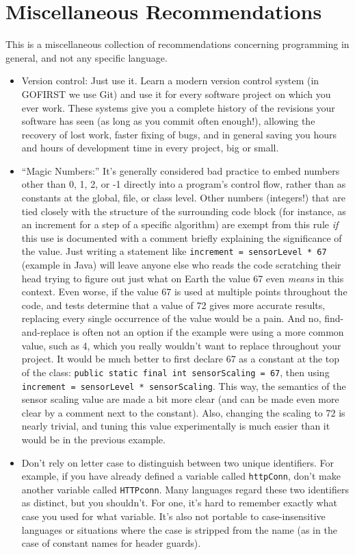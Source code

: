 \documentclass[12pt]{article}
\newcommand{\code}[1]{\texttt{#1}}
\begin{document}
\section{Miscellaneous Recommendations}
This is a miscellaneous collection of recommendations concerning programming in general, and not any specific language.
\begin{itemize}
    \item Version control: Just use it. Learn a modern version control system (in GOFIRST we use Git) and use it for every software project on which you ever work. These systems give you a complete history of the revisions your software has seen (as long as you commit often enough!), allowing the recovery of lost work, faster fixing of bugs, and in general saving you hours and hours of development time in every project, big or small.
    \item ``Magic Numbers:'' It's generally considered bad practice to embed numbers other than 0, 1, 2, or -1 directly into a program's control flow, rather than as constants at the global, file, or class level. Other numbers (integers!) that are tied closely with the structure of the surrounding code block (for instance, as an increment for a step of a specific algorithm) are exempt from this rule \emph{if} this use is documented with a comment briefly explaining the significance of the value. Just writing a statement like \code{increment = sensorLevel * 67} (example in Java) will leave anyone else who reads the code scratching their head trying to figure out just what on Earth the value 67 even \emph{means} in this context. Even worse, if the value 67 is used at multiple points throughout the code, and tests determine that a value of 72 gives more accurate results, replacing every single occurrence of the value would be a pain. And no, find-and-replace is often not an option if the example were using a more common value, such as 4, which you really wouldn't want to replace throughout your project. It would be much better to first declare 67 as a constant at the top of the class: \code{public static final int sensorScaling = 67}, then using \code{increment = sensorLevel * sensorScaling}. This way, the semantics of the sensor scaling value are made a bit more clear (and can be made even more clear by a comment next to the constant). Also, changing the scaling to 72 is nearly trivial, and tuning this value experimentally is much easier than it would be in the previous example.
    \item Don't rely on letter case to distinguish between two unique identifiers. For example, if you have already defined a variable called \code{httpConn}, don't make another variable called \code{HTTPconn}. Many languages regard these two identifiers as distinct, but you shouldn't. For one, it's hard to remember exactly what case you used for what variable. It's also not portable to case-insensitive languages or situations where the case is stripped from the name (as in the case of constant names for header guards).

\end{itemize}
\end{document}

